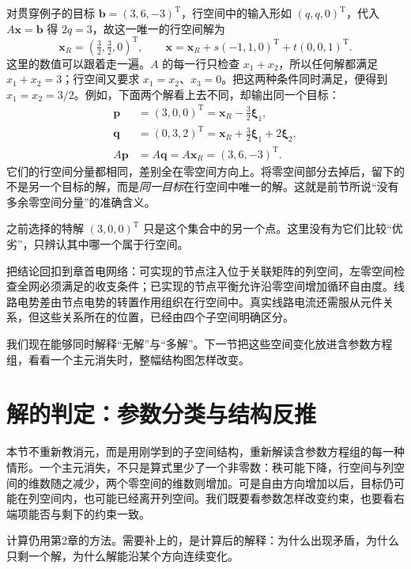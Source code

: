 \documentclass[a4paper,12pt,twoside,openany,fontset=none]{ctexbook}
\numberwithin{equation}{chapter}
\begin{document}
对贯穿例子的目标 $\boldsymbol b=(3,6,-3)^{\mathrm T}$，行空间中的输入形如 $(q,q,0)^{\mathrm T}$，代入 $A\boldsymbol x=\boldsymbol b$ 得 $2q=3$，故这一唯一的行空间解为
\begin{equation}
 \boldsymbol x_R=(\tfrac32,\tfrac32,0)^{\mathrm T},\qquad
 \boldsymbol x=\boldsymbol x_R+s(-1,1,0)^{\mathrm T}+t(0,0,1)^{\mathrm T}.
\end{equation}
这里的数值可以跟着走一遍。$A$ 的每一行只检查 $x_1+x_2$，所以任何解都满足 $x_1+x_2=3$；行空间又要求 $x_1=x_2$、$x_3=0$。把这两种条件同时满足，便得到 $x_1=x_2=3/2$。例如，下面两个解看上去不同，却输出同一个目标：
\begin{align}
 \boldsymbol p&=(3,0,0)^{\mathrm T}
 =\boldsymbol x_R-\tfrac32\boldsymbol\xi_1,\\
 \boldsymbol q&=(0,3,2)^{\mathrm T}
 =\boldsymbol x_R+\tfrac32\boldsymbol\xi_1+2\boldsymbol\xi_2,\\
 A\boldsymbol p&=A\boldsymbol q=A\boldsymbol x_R=(3,6,-3)^{\mathrm T}.
\end{align}
它们的行空间分量都相同，差别全在零空间方向上。将零空间部分去掉后，留下的不是另一个目标的解，而是\emph{同一目标}在行空间中唯一的解。这就是前节所说“没有多余零空间分量”的准确含义。

之前选择的特解 $(3,0,0)^{\mathrm T}$ 只是这个集合中的另一个点。这里没有为它们比较“优劣”，只辨认其中哪一个属于行空间。

把结论回扣到章首电网络：可实现的节点注入位于关联矩阵的列空间，左零空间检查全网必须满足的收支条件；已实现的节点平衡允许沿零空间增加循环自由度。线路电势差由节点电势的转置作用组织在行空间中。真实线路电流还需服从元件关系，但这些关系所在的位置，已经由四个子空间明确区分。

我们现在能够同时解释“无解”与“多解”。下一节把这些空间变化放进含参数方程组，看看一个主元消失时，整幅结构图怎样改变。

\section{解的判定：参数分类与结构反推}
\label{sec:five-parameter}

本节不重新教消元，而是用刚学到的子空间结构，重新解读含参数方程组的每一种情形。一个主元消失，不只是算式里少了一个非零数：秩可能下降，行空间与列空间的维数随之减少，两个零空间的维数则增加。可是自由方向增加以后，目标仍可能在列空间内，也可能已经离开列空间。我们既要看参数怎样改变约束，也要看右端项能否与剩下的约束一致。

计算仍用第2章的方法。需要补上的，是计算后的解释：为什么出现矛盾，为什么只剩一个解，为什么解能沿某个方向连续变化。
\end{document}
